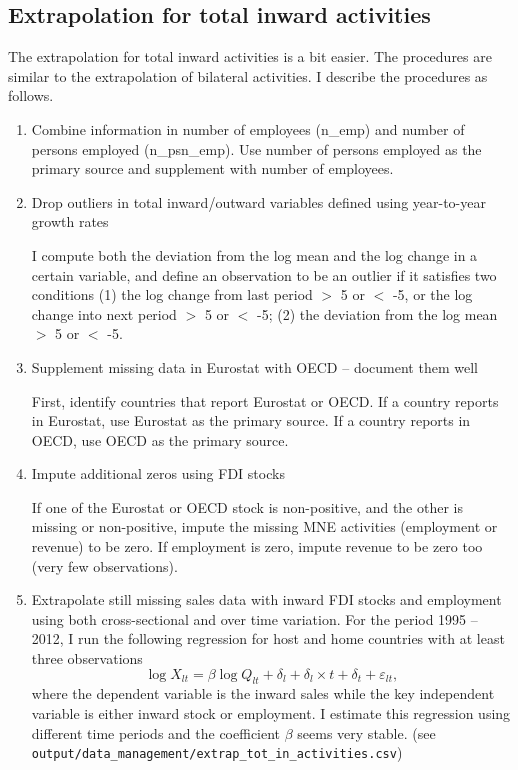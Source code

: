 \documentclass[notitlepage,11pt]{article}%
\begin{document}
\subsection{Extrapolation for total inward activities}

The extrapolation for total inward activities is a bit easier. The procedures
are similar to the extrapolation of bilateral activities. I describe the
procedures as follows.

\begin{enumerate}
\item Combine information in number of employees (n\_emp) and number of
persons employed (n\_psn\_emp). Use number of persons employed as the primary
source and supplement with number of employees.

\item Drop outliers in total inward/outward variables defined using
year-to-year growth rates

I compute both the deviation from the log mean and the log change in a certain
variable, and define an observation to be an outlier if it satisfies two
conditions (1) the log change from last period
$>$
5 or
$<$
-5, or the log change into next period
$>$%
5 or
$<$
-5; (2) the deviation from the log mean
$>$
5 or
$<$
-5. 

\item Supplement missing data in Eurostat with OECD -- document them well

First, identify countries that report Eurostat or OECD. If a country reports
in Eurostat, use Eurostat as the primary source. If a country reports in OECD,
use OECD as the primary source.

\item Impute additional zeros using FDI stocks

If one of the Eurostat or OECD stock is non-positive, and the other is missing
or non-positive, impute the missing MNE activities (employment or revenue) to
be zero. If employment is zero, impute revenue to be zero too (very few observations).

\item Extrapolate still missing sales data with inward FDI stocks and
employment using both cross-sectional and over time variation. For the period
1995 -- 2012, I run the following regression for host and home countries with
at least three observations%
\[
\log X_{lt}=\beta\log Q_{lt}+\delta_{l}+\delta_{l}\times t+\delta
_{t}+\varepsilon_{lt},
\]
where the dependent variable is the inward sales while the key independent
variable is either inward stock or employment. I estimate this regression
using different time periods and the coefficient $\beta$ seems very stable.
(see \texttt{output/data\_management/extrap\_tot\_in\_activities.csv})


\end{enumerate}
\end{document}
